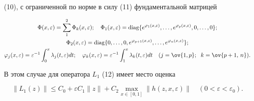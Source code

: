 (10), с ограниченной по норме в силу (11) фундаментальной матрицей 


\begin{gather*} 


\Phi(x,\varepsilon)=\sum^2_1\Phi_k(x,\varepsilon);\quad 


\Phi_1(x,\varepsilon)=\diag\{e^{\varphi_1(x,\varepsilon)},\dotsc, 


e^{\varphi_p(x,\varepsilon)},0,\dotsc,0\}; \\ 


%


\Phi_2(x,\varepsilon)=\diag\{0,\dotsc,0,


e^{\varphi_{p+1}(x,\varepsilon)},\dotsc, 


e^{\varphi_n(x,\varepsilon)}\}; \\ 


%


\varphi_j(x,\varepsilon)=\varepsilon^{-1}\int^x_0 


\lambda_j(t,\varepsilon)dt;\quad 


\varphi_k(x,\varepsilon)=\varepsilon^{-1}\int^x_1 


\lambda_k(t,\varepsilon)dt\quad 


(j=\ov{1,p};\ \; k=\ov{p+1,\,n}). 


\end{gather*} 


В этом случае для оператора $L_1$ (12) имеет место оценка 


\begin{equation} 


\|L_1(z)\|\le C_0+\varepsilon C_1\|z\|+ 


C_2\max_{x\in[0,1]}\|h(z,x,\varepsilon)\|\quad 


(0<\varepsilon<\varepsilon_0). 


\end{equation} 


 


